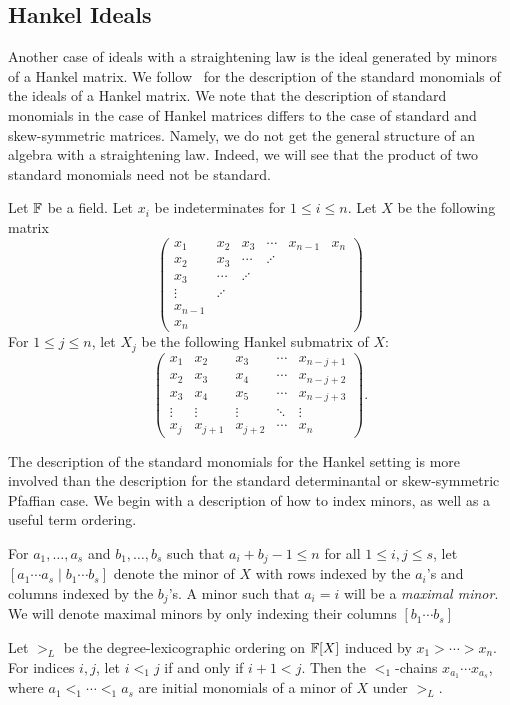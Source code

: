 \documentclass[letterpaper, 11pt]{amsart}
\begin{document}
\subsection{Hankel Ideals}

Another case of ideals with a straightening law is the ideal generated by minors of a Hankel matrix.
We follow~\cite{Con98} for the description of the standard monomials of the ideals of a Hankel matrix.
We note that the description of standard monomials in the case of Hankel matrices differs to the case of standard and skew-symmetric matrices.
Namely, we do not get the general structure of an algebra with a straightening law.
Indeed, we will see that the product of two standard monomials need not be standard.

Let $\mathbb{F}$ be a field.
Let $x_{i}$ be indeterminates for $1 \leq i \leq n$.
Let $X$ be the following matrix
\[
  \begin{pmatrix}
    x_1 & x_2 & x_3 & \cdots & x_{n - 1} & x_n \\
    x_2 & x_3 & \cdots    & \iddots       &           &     \\
    x_3 & \cdots    & \iddots    &        &           &     \\
    \vdots & \iddots &     &        &           &     \\
    x_{n -1} & &    &        &           &     \\
    x_n      & &    &        &           &
  \end{pmatrix}
\]
For $1 \leq  j \leq n$, let $X_j$ be the following Hankel submatrix of $X$:
\[
  \begin{pmatrix}
    x_1 & x_2 & x_3 & \cdots & x_{n - j + 1} \\
    x_2 & x_3 & x_4 & \cdots & x_{n - j + 2} \\
    x_3 & x_4 & x_5 & \cdots & x_{n - j + 3} \\
    \vdots & \vdots & \vdots & \ddots & \vdots \\
    x_{j} & x_{j + 1} & x_{j + 2} & \cdots & x_{n}
  \end{pmatrix}.
\]

The description of the standard monomials for the Hankel setting is more involved than the description for the standard determinantal or skew-symmetric Pfaffian case.
We begin with a description of how to index minors, as well as a useful term ordering.
\begin{defn}
  For $a_1, \ldots, a_s$ and $b_1, \ldots, b_s$ such that $a_i + b_j - 1 \leq n$ for all $1 \leq i, j \leq s$, let $[a_1 \cdots a_s \mid b_1 \cdots b_s]$ denote the minor of $X$ with rows indexed by the $a_i$'s and columns indexed by the $b_j$'s.
  A minor such that $a_i = i$ will be a \emph{maximal minor}.
  We will denote maximal minors by only indexing their columns $[b_1 \cdots b_s]$

  Let $>_L$ be the degree-lexicographic ordering on $\mathbb{F}[X]$ induced by $x_1 > \cdots > x_n$.
  For indices $i, j$, let $i <_1 j$ if and only if $i + 1 < j$.
  Then the $<_1$-chains $x_{a_1} \cdots x_{a_s}$, where $a_1 <_1 \cdots <_1 a_s$ are initial monomials of a minor of $X$ under $>_L$.
\end{defn}
\end{document}
